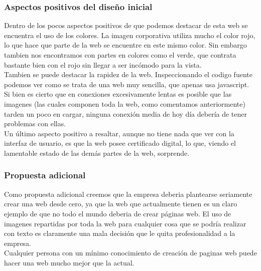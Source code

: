 \documentclass[a4paper,11pt]{article}
\begin{document}
\subsubsection{Aspectos positivos del diseño inicial}
Dentro de los pocos aspectos positivos de que podemos destacar de esta web se encuentra el uso de los colores. La imagen corporativa utiliza mucho el color rojo, lo que hace que parte de la web se encuentre en este mismo color. Sin embargo tambien nos encontramos con partes en colores como el verde, que contrata bastante bien con el rojo sin llegar a ser incómodo para la vista.\\
Tambien se puede destacar la rapidez de la web. Inspeccionando el codigo fuente podemos ver como se trata de una web muy sencilla, que apenas usa javascript. Si bien es cierto que en conexiones excesivamente lentas es posible que las imagenes (las cuales componen toda la web, como comentamos anteriormente) tarden un poco en cargar, ninguna conexión media de hoy día debería de tener problemas con ellas.\\
Un último aspecto positivo a resaltar, aunque no tiene nada que ver con la interfaz de usuario, es que la web posee certificado digital, lo que, viendo el lamentable estado de las demás partes de la web, sorprende.


\subsubsection{Propuesta adicional}
Como propuesta adicional creemos que la empresa deberia plantearse seriamente crear una web desde cero, ya que la web que actualmente tienen es un claro ejemplo de que no todo el mundo deberia de crear páginas web. El uso de imagenes repartidas por toda la web para cualquier cosa que se podría realizar con texto es claramente una mala decisión que le quita profesionalidad a la empresa.\\
Cualquier persona con un mínimo conocimiento de creación de paginas web puede hacer una web mucho mejor que la actual.
\end{document}
